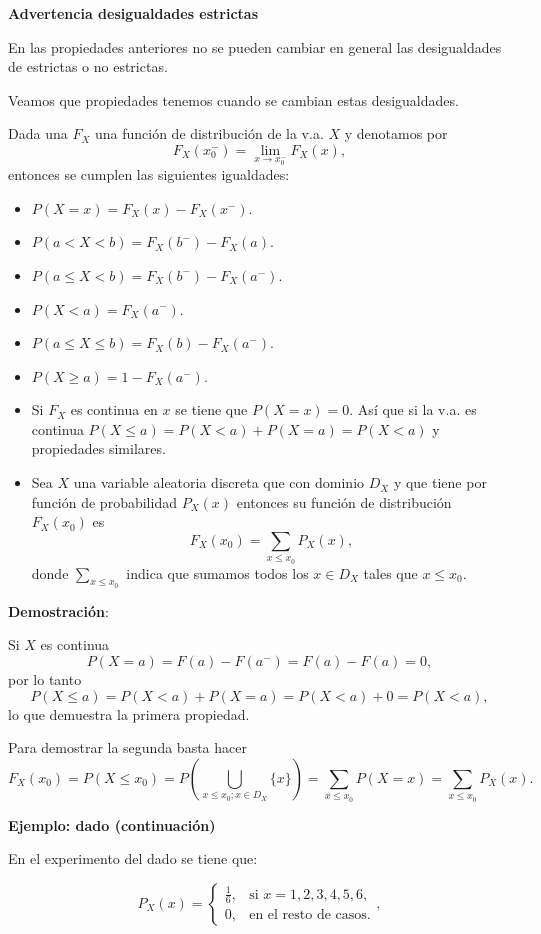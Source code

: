 \documentclass[]{book}
\providecommand{\tightlist}{%
  \setlength{\itemsep}{0pt}\setlength{\parskip}{0pt}}
\begin{document}
\textbf{Advertencia desigualdades estrictas}

En las propiedades anteriores no se pueden cambiar en general las desigualdades de
estrictas o no estrictas.

Veamos que propiedades tenemos cuando se cambian estas
desigualdades.

Dada una \(F_{X}\) una función de distribución de la v.a. \(X\) y denotamos por \[F_{X}(x_0^{-})=\displaystyle \lim_{x\to x_0^{-}} F_{X}(x),\]
entonces se cumplen las siguientes igualdades:

\begin{itemize}
\tightlist
\item
  \(P(X=x)=F_{X}(x)-F_{X}(x^{-})\).
\item
  \(P(a< X< b)=F_{X}(b^{-})-F_{X}(a)\).
\item
  \(P(a\leq X< b)=F_{X}(b^{-})-F_{X}(a^{-})\).
\item
  \(P(X<a)=F_{X}(a^{-})\).
\item
  \(P(a\leq X\leq b)=F_{X}(b)-F_{X}(a^{-})\).
\item
  \(P(X\geq a)=1-F_{X}(a^{-})\).
\item
  Si \(F_X\) es continua en \(x\) se tiene que \(P(X=x)=0\).
  Así que si la v.a. es continua \(P(X\leq a)=P(X< a)+P(X=a)=P(X<a)\) y propiedades similares.
\item
  Sea \(X\) una variable aleatoria discreta que con dominio \(D_X\) y
  que tiene por función de probabilidad \(P_{X}(x)\) entonces su función de distribución
  \(F_{X}(x_0)\) es
  \[F_{X}(x_0)=\sum_{x\leq x_0} P_{X}(x),\]
  donde \(\sum\limits_{x\leq x_0}\) indica que sumamos todos los \(x \in D_X\) tales que \(x\leq x_0\).
\end{itemize}

\textbf{Demostración}:

Si \(X\) es continua \[P(X=a)=F(a)-F(a^{-})=F(a)-F(a)=0,\]
por lo tanto
\[P(X\leq a)=P(X<a)+P(X=a)= P(X<a)+0= P(X<a),\]
lo que demuestra la primera propiedad.

Para demostrar la segunda basta hacer
\[ 
F_{X}(x_0)= P(X\leq x_0)=P\left(\bigcup_{x\leq
x_0; x\in D_X} \{x\}\right)= \sum_{x\leq x_0}P(X=x)= \sum_{x\leq x_0}P_{X}(x).
\]

\textbf{Ejemplo: dado (continuación)}

En el experimento del dado se tiene que:

\[P_{X}(x)=\left\{\begin{array}{ll} \frac16, & \mbox{si } x=1,2,3,4,5,6,\\ 0, & \mbox{en el resto de casos.}\end{array}\right.,\]
\end{document}
